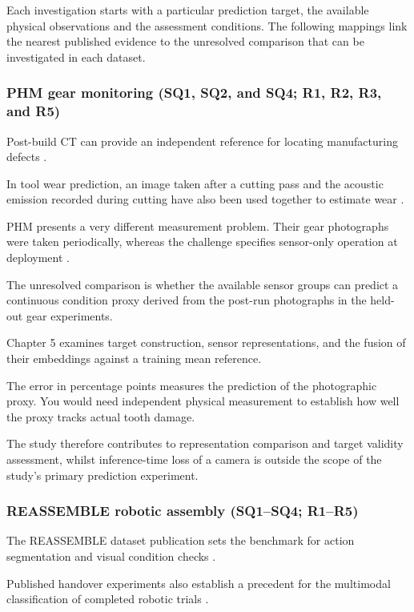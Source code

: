 Each investigation starts with a particular prediction target, the available physical observations
and the assessment conditions. The following mappings link the nearest published evidence to the
unresolved comparison that can be investigated in each dataset.

\subsubsection*{PHM gear monitoring (SQ1, SQ2, and SQ4; R1, R2, R3, and R5)}

Post-build CT can provide an independent reference for locating manufacturing defects
\citep{Petrich2021Multimodal}.

In tool wear prediction, an image taken after a cutting pass and the acoustic emission recorded
during cutting have also been used together to estimate wear \citep[PDF pp.~19--24]{P045}.

PHM presents a very different measurement problem. Their gear photographs were taken periodically,
whereas the challenge specifies sensor-only operation at deployment \citep{PHM2026Challenge}.

The unresolved comparison is whether the available sensor groups can predict a continuous condition
proxy derived from the post-run photographs in the held-out gear experiments.

Chapter 5 examines target construction, sensor representations, and the fusion of their embeddings
against a training mean reference.

The error in percentage points measures the prediction of the photographic proxy. You would need
independent physical measurement to establish how well the proxy tracks actual tooth damage.

The study therefore contributes to representation comparison and target validity assessment, whilst
inference-time loss of a camera is outside the scope of the study's primary prediction experiment.

\subsubsection*{REASSEMBLE robotic assembly (SQ1--SQ4; R1--R5)}

The REASSEMBLE dataset publication sets the benchmark for action segmentation and visual condition
checks \citep[PDF pp.~10--13]{Sliwowski2025REASSEMBLE}.

Published handover experiments also establish a precedent for the multimodal classification of
completed robotic trials \citep[Table~III]{Thoduka2024Handover}.

